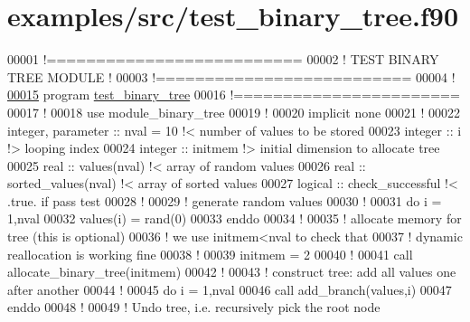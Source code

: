 \hypertarget{test__binary__tree_8f90_source}{
\section{examples/src/test\-\_\-binary\-\_\-tree.f90}
}

\begin{DoxyCode}
00001 \textcolor{comment}{!==========================}
00002 \textcolor{comment}{! TEST BINARY TREE MODULE !}
00003 \textcolor{comment}{!========================== }
00004 \textcolor{comment}{!}
\hypertarget{test__binary__tree_8f90_source_l00015}{}\hyperlink{test__binary__tree_8f90_abd024c483ff80c18521afd95f7df736b}{00015} \textcolor{keyword}{program} \hyperlink{test__binary__tree_8f90_abd024c483ff80c18521afd95f7df736b}{test_binary_tree}
00016 \textcolor{comment}{!=======================}
00017   \textcolor{comment}{!}
00018   use \textcolor{keywordflow}{module\_binary\_tree}
00019   \textcolor{comment}{!}
00020   \textcolor{keyword}{implicit none} 
00021   \textcolor{comment}{!}
00022   \textcolor{keywordtype}{integer}, \textcolor{keywordtype}{parameter} :: nval = 10 \textcolor{comment}{!< number of values to be stored}
00023   \textcolor{keywordtype}{integer} :: i !> looping index
00024   \textcolor{keywordtype}{integer} :: initmem !> initial dimension to allocate tree
00025   \textcolor{keywordtype}{real} :: values(nval) \textcolor{comment}{!< array of random values}
00026   \textcolor{keywordtype}{real} :: sorted\_values(nval) \textcolor{comment}{!< array of sorted values}
00027   \textcolor{keywordtype}{logical} :: check\_successful \textcolor{comment}{!< .true. if pass test}
00028   \textcolor{comment}{!}
00029   \textcolor{comment}{! generate random values}
00030   \textcolor{comment}{!}
00031   \textcolor{keyword}{do} i = 1,nval
00032      values(i) = rand(0)
00033   \textcolor{keyword}{enddo}
00034   \textcolor{comment}{!}
00035   \textcolor{comment}{! allocate memory for tree (this is optional)}
00036   \textcolor{comment}{! we use initmem<nval to check that}
00037   \textcolor{comment}{! dynamic reallocation is working fine}
00038   \textcolor{comment}{! }
00039   initmem = 2
00040   \textcolor{comment}{!}
00041   call allocate\_binary\_tree(initmem)
00042   \textcolor{comment}{!}
00043   \textcolor{comment}{! construct tree: add all values one after another}
00044   \textcolor{comment}{!}
00045   \textcolor{keyword}{do} i = 1,nval
00046      call add\_branch(values,i)
00047   \textcolor{keyword}{enddo} 
00048   \textcolor{comment}{!}
00049   \textcolor{comment}{! Undo tree, i.e. recursively pick the root node}

\end{DoxyCode}
